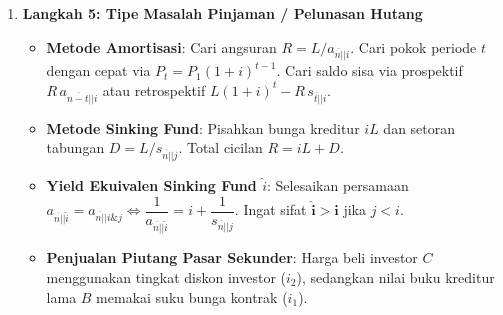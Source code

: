 \documentclass[10pt,a4paper]{article}
\newcommand{\angl}[1]{\overline{#1|}}
\begin{document}
\begin{teoremabox}
\begin{enumerate}[leftmargin=1.5em, topsep=1pt, itemsep=1pt]
    \begin{itemize}[leftmargin=1.2em, topsep=0.5pt, itemsep=0.5pt]
        \item Dimulai nanti $\implies$ kalikan faktor diskon $v^m$.
        \item Berlangsung selamanya $\implies$ Perpetuitas ($n \to \infty$).
    \end{itemize}
    \item \textbf{Langkah 5: Tipe Masalah Pinjaman / Pelunasan Hutang}
    \begin{itemize}[leftmargin=1.2em, topsep=0.5pt, itemsep=0.5pt]
        \item \textbf{Metode Amortisasi}: Cari angsuran $R = L/a_{\angl{n}|i}$. Cari pokok periode $t$ dengan cepat via $P_t = P_1(1+i)^{t-1}$. Cari saldo sisa via prospektif $R \, a_{\angl{n-t}|i}$ atau retrospektif $L(1+i)^t - R \, s_{\angl{t}|i}$.
        \item \textbf{Metode Sinking Fund}: Pisahkan bunga kreditur $i L$ dan setoran tabungan $D = L/s_{\angl{n}|j}$. Total cicilan $R = i L + D$.
        \item \textbf{Yield Ekuivalen Sinking Fund $\hat{i}$}: Selesaikan persamaan $a_{\angl{n}|\hat{i}} = a_{\angl{n}|i \& j} \iff \dfrac{1}{a_{\angl{n}|\hat{i}}} = i + \dfrac{1}{s_{\angl{n}|j}}$. Ingat sifat $\mathbf{\hat{i} > i}$ jika $j < i$.
        \item \textbf{Penjualan Piutang Pasar Sekunder}: Harga beli investor $C$ menggunakan tingkat diskon investor ($i_2$), sedangkan nilai buku kreditur lama $B$ memakai suku bunga kontrak ($i_1$).
    \end{itemize}
\end{enumerate}
\end{teoremabox}
\end{document}
